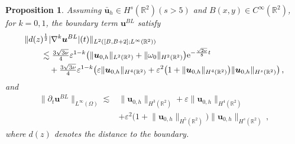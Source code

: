 \documentclass[pdflatex,sn-mathphys-num]{sn-jnl}%
\theoremstyle{thmstyleone}%
\newtheorem{proposition}[theorem]{Proposition}%
\theoremstyle{thmstyletwo}%
\theoremstyle{thmstylethree}%
\theoremstyle{thmstyletwo}
\begin{document}
\begin{proposition}\label{propBL}
	Assuming $\bar{\boldsymbol{u}}_h\in H^s(\mathbb{R}^2)(s>5)$ and $B(x,y)\in C^\infty(\mathbb{R}^2)$, for $k=0,1$, the boundary term $\boldsymbol{u}^{BL}$  satisfy
	\begin{align*} 
		&\lVert d(z)^{\frac{1}{2}} |\nabla^k\boldsymbol{u}^{BL}|(t) \rVert_{{L}^2([B,B+2];{L}^\infty(\mathbb{R}^2))}
		\\
		&\qquad\lesssim
		\tfrac{3\sqrt{3\nu}}{4}
		\varepsilon^{1-k}
		\big(
		\lVert{\boldsymbol{u}}_{0,h}\rVert_{L^2(\mathbb{R}^2)}+\lVert{\omega}_0\rVert_{H^2(\mathbb{R}^2)}	
		\big)\mathrm{e}^{-\frac{\sqrt{2\nu}}{8}  t}
		\notag\\
		&\qquad\quad+\tfrac{3\sqrt{3\nu}}{4}
		\varepsilon^{1-k}
		\big(
		\varepsilon
		\lVert {\boldsymbol{u}}_{0,h} \rVert_{H^{4}(\mathbb{R}^2)}+
		\varepsilon^2
		\big(
		1+
		\lVert {\boldsymbol{u}}_{0,h} \rVert_{H^{4}(\mathbb{R}^2)}
		\big)
		\lVert {\boldsymbol{u}}_{0,h} \rVert_{H^{s}(\mathbb{R}^2)}
		\big)\,,
	\end{align*}
	and
	\begin{align*} 
		\lVert \partial_t\boldsymbol{u}^{BL} \rVert_{L^\infty(\Omega)}
		\lesssim
		&\lVert{\boldsymbol{u}}_{0,h}\rVert_{H^{3}(\mathbb{R}^2)}
		+\varepsilon
		\lVert{\boldsymbol{u}}_{0,h}\rVert_{H^{4}(\mathbb{R}^2)}\\
		&+\varepsilon^2
		\big(
		1+
		\lVert {\boldsymbol{u}}_{0,h} \rVert_{H^{5}(\mathbb{R}^2)}
		\big)\lVert {\boldsymbol{u}}_{0,h} \rVert_{H^{s}(\mathbb{R}^2)}\,,
	\end{align*}	
	where $d(z)$ denotes the distance to the boundary.
\end{proposition}
\end{document}
